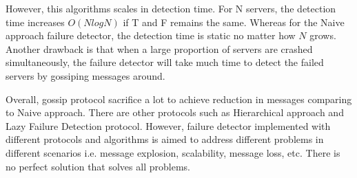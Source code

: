 \documentclass[dareport.tex]{subfiles}
\begin{document}
However, this algorithms scales in detection time. For N servers, the detection time increases $O(NlogN)$\cite{gossip} if T and F remains the same. Whereas for the Naive approach failure detector, the detection time is static no matter how $N$ grows. Another drawback is that when a large proportion of servers are crashed simultaneously, the failure detector will take much time to detect the failed servers by gossiping messages around.


Overall, gossip protocol sacrifice a lot to achieve reduction in messages comparing to Naive approach. There are other protocols such as Hierarchical approach and Lazy Failure Detection protocol\cite{failuredetector}. However, failure detector implemented with different protocols and algorithms is aimed to address different problems in different scenarios i.e. message explosion, scalability, message loss, etc. There is no perfect solution that solves all problems.
\end{document}
